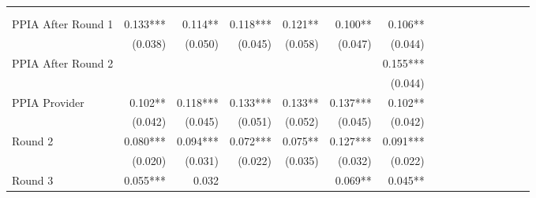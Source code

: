 \begin{tabular}{@{\extracolsep{5pt}}lrrrrrrrrrrrrrrr}
\toprule
& \multicolumn{1}{p{0.13\linewidth}}{\centering{(1)}} & \multicolumn{1}{p{0.13\linewidth}}{\centering{(2)}} & \multicolumn{1}{p{0.13\linewidth}}{\centering{(3)}} & \multicolumn{1}{p{0.13\linewidth}}{\centering{(4)}} & \multicolumn{1}{p{0.13\linewidth}}{\centering{(5)}} & \multicolumn{1}{p{0.13\linewidth}}{\centering{(6)}} \\
& \multicolumn{1}{p{0.13\linewidth}}{\centering{Pooled Model}} & \multicolumn{1}{p{0.13\linewidth}}{\centering{Sample 1a Pooled}} & \multicolumn{1}{p{0.13\linewidth}}{\centering{Diff$-$Diff Model}} & \multicolumn{1}{p{0.13\linewidth}}{\centering{Sample 1a Diff$-$Diff}} & \multicolumn{1}{p{0.13\linewidth}}{\centering{Restricted Sample}} & \multicolumn{1}{p{0.13\linewidth}}{\centering{Separate Effects}} \\
\hline
PPIA After Round 1 & 0.133\phantom{)}*** & 0.114\phantom{)}**\phantom{*} & 0.118\phantom{)}*** & 0.121\phantom{)}**\phantom{*} & 0.100\phantom{)}**\phantom{*} & 0.106\phantom{)}**\phantom{*} \\
& (0.038)\phantom{***} & (0.050)\phantom{***} & (0.045)\phantom{***} & (0.058)\phantom{***} & (0.047)\phantom{***} & (0.044)\phantom{***} \\
PPIA After Round 2 & \phantom{***} & \phantom{***} & \phantom{***} & \phantom{***} & \phantom{***} & 0.155\phantom{)}*** \\
& \phantom{***} & \phantom{***} & \phantom{***} & \phantom{***} & \phantom{***} & (0.044)\phantom{***} \\
PPIA Provider & 0.102\phantom{)}**\phantom{*} & 0.118\phantom{)}*** & 0.133\phantom{)}*** & 0.133\phantom{)}**\phantom{*} & 0.137\phantom{)}*** & 0.102\phantom{)}**\phantom{*} \\
& (0.042)\phantom{***} & (0.045)\phantom{***} & (0.051)\phantom{***} & (0.052)\phantom{***} & (0.045)\phantom{***} & (0.042)\phantom{***} \\
Round 2 & 0.080\phantom{)}*** & 0.094\phantom{)}*** & 0.072\phantom{)}*** & 0.075\phantom{)}**\phantom{*} & 0.127\phantom{)}*** & 0.091\phantom{)}*** \\
& (0.020)\phantom{***} & (0.031)\phantom{***} & (0.022)\phantom{***} & (0.035)\phantom{***} & (0.032)\phantom{***} & (0.022)\phantom{***} \\
Round 3 & 0.055\phantom{)}*** & 0.032\phantom{\phantom{)}***} & \phantom{***} & \phantom{***} & 0.069\phantom{)}**\phantom{*} & 0.045\phantom{)}**\phantom{*} \\

\end{tabular}
